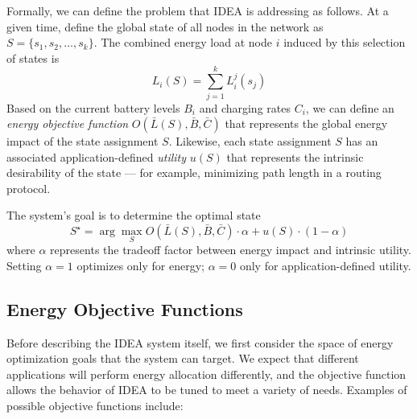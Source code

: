 Formally, we can define the problem that IDEA is addressing as follows. At a
given time, define the global state of all nodes in the network as $S = \{
s_1, s_2, \ldots, s_k \}$.  The combined energy load at node $i$ induced by
this selection of states is \[ L_i(S) = \sum_{j=1}^k L_i^j(s_j) \] Based on
the current battery levels $B_i$ and charging rates $C_i$, we can define an
\textit{energy objective function} $O(\bar{L}(S), \bar{B}, \bar{C})$ that
represents the global energy impact of the state assignment $S$.  Likewise,
each state assignment $S$ has an associated application-defined
\textit{utility} $u(S)$ that represents the intrinsic desirability of the
state --- for example, minimizing path length in a routing protocol.

The system's goal is to determine the optimal state \[ S^\star = \arg
\max_{S} O(\bar{L}(S), \bar{B}, \bar{C}) \cdot \alpha + u(S) \cdot
(1-\alpha)\] where $\alpha$ represents the tradeoff factor between energy
impact and intrinsic utility. Setting $\alpha=1$ optimizes only for energy;
$\alpha=0$ only for application-defined utility.

\subsection{Energy Objective Functions}
\label{idea-subsec-energyobjectivefunctions}

Before describing the IDEA system itself, we first consider the space
of energy optimization goals that the system can target.
We expect that different applications will perform
energy allocation differently, and the objective function allows
the behavior of IDEA to be tuned to meet a variety of needs.
Examples of possible objective functions include:

